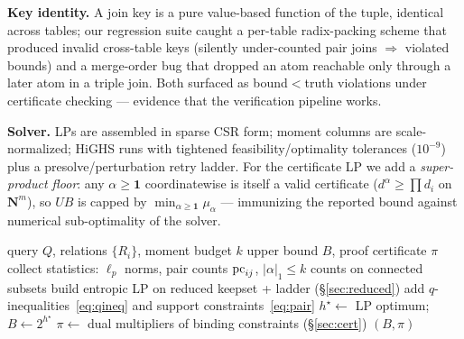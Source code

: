 \textbf{Key identity.}
A join key is a pure value-based function of the tuple, identical
across tables; our regression suite caught a per-table radix-packing
scheme that produced invalid cross-table keys (silently under-counted
pair joins $\Rightarrow$ violated bounds) and a merge-order bug that
dropped an atom reachable only through a later atom in a triple join.
Both surfaced as bound$<$truth violations under certificate
checking --- evidence that the verification pipeline works.

\textbf{Solver.}
LPs are assembled in sparse CSR form; moment columns are
scale-normalized; HiGHS runs with tightened feasibility/optimality
tolerances ($10^{-9}$) plus a presolve/perturbation retry ladder.
For the certificate LP we add a \emph{super-product floor}: any
$\alpha \ge \mathbf{1}$ coordinatewise is itself a valid certificate
($d^\alpha \ge \prod d_i$ on $\mathbf{N}^m$), so $UB$ is capped by
$\min_{\alpha\ge\mathbf{1}}\mu_\alpha$ --- immunizing the reported
bound against numerical sub-optimality of the solver.

\begin{algorithm}[t]
\caption{\framework{} bound computation}
\label{alg:bound}
\begin{algorithmic}[1]
\REQUIRE query $Q$, relations $\{R_i\}$, moment budget $k$
\ENSURE upper bound $B$, proof certificate $\pi$
\STATE collect statistics: $\ell_p$ norms, pair counts $\text{pc}_{ij}$,
   $|\alpha|_1 \le k$ counts on connected subsets
\STATE build entropic LP on reduced keepset + ladder (\S\ref{sec:reduced})
\STATE add $q$-inequalities~\eqref{eq:qineq} and support
   constraints~\eqref{eq:pair}
\STATE $h^\star \gets$ LP optimum;\quad $B \gets 2^{h^\star}$
\STATE $\pi \gets$ dual multipliers of binding constraints (\S\ref{sec:cert})
\STATE \RETURN $(B,\pi)$
\end{algorithmic}
\end{algorithm}
